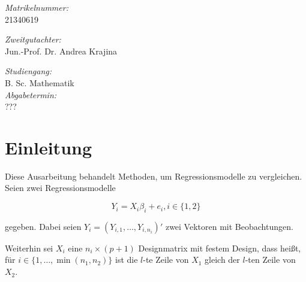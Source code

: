 \documentclass[12pt,a4paper]{article}
\theoremstyle{definition}
\theoremstyle{definition}
\theoremstyle{definition}
\begin{document}
\begin{titlepage}
\begin{center}
\begin{minipage}{0.4\textwidth}
\begin{flushleft} \large
\emph{Matrikelnummer:}\\
21340619\\
\end{flushleft}
\end{minipage}
\hfill
\begin{minipage}{0.4\textwidth}
\begin{flushright} \large
\emph{Zweitgutachter:}\\
Jun.-Prof. Dr. Andrea Krajina\\
\end{flushright}
\end{minipage}
\begin{flushleft}
\begin{minipage}{0.4\textwidth}
\begin{flushleft} \large
\emph{Studiengang:}\\
B. Sc. Mathematik\\
\emph{Abgabetermin:}\\
???\\
\end{flushleft}
\end{minipage}
\end{flushleft}
\hfill


\end{center}

\newpage 
\thispagestyle{empty}
\quad 
\newpage
\end{titlepage}
\newpage

\tableofcontents
\newpage
\thispagestyle{empty}
\quad 


\section*{Einleitung}
Diese Ausarbeitung behandelt Methoden, um Regressionsmodelle zu vergleichen. Seien zwei Regressionsmodelle 

\begin{equation*}
Y_i = X_i \beta_i + e_i , i \in \{1,2\}
\end{equation*}

gegeben. Dabei seien $Y_i=(Y_{i,1}, \ldots, Y_{i,n_i})'$ zwei Vektoren mit Beobachtungen.
 
Weiterhin sei $X_i$ eine $n_i \times (p+1)$ Designmatrix mit festem Design, dass heißt, für $i \in \{ 1, \ldots, \min(n_1, n_2)\}$ ist die $l$-te Zeile von $X_1$ gleich der $l$-ten Zeile von $X_2$.
\end{document}
